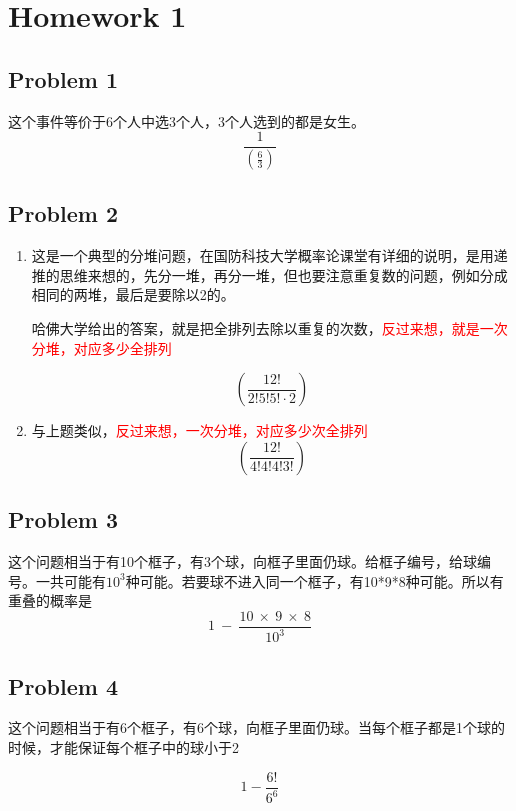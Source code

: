 \documentclass{article}
\begin{document}
\clearpage


\section*{Homework 1}
\subsection*{Problem 1}
这个事件等价于6个人中选3个人，3个人选到的都是女生。
$$
\frac{1}{\left( \frac{6}{3} \right)  } 
$$

\clearpage
\subsection*{Problem 2}
\begin{enumerate}[label=(\alph*)]
\item 这是一个典型的分堆问题，在国防科技大学概率论课堂有详细的说明，是用递推的思维来想的，先分一堆，再分一堆，但也要注意重复数的问题，例如分成相同的两堆，最后是要除以2的。

哈佛大学给出的答案，就是把全排列去除以重复的次数，\textcolor{red}{反过来想，就是一次分堆，对应多少全排列}

$$
\left( \frac{12!}{2!5!5!\cdot 2} \right)  
$$

\item 与上题类似，\textcolor{red}{反过来想，一次分堆，对应多少次全排列}
$$
\left( \frac{12!}{4!4!4!3!} \right)  
$$

\end{enumerate}

\clearpage


\subsection*{Problem 3}
这个问题相当于有10个框子，有3个球，向框子里面仍球。给框子编号，给球编号。一共可能有$10^{3}$种可能。若要球不进入同一个框子，有10*9*8种可能。所以有重叠的概率是 
$$
1\  -\  \frac{10\  \times \  9\  \times \  8}{{}10^{3}} 
$$

\clearpage

\subsection*{Problem 4}
这个问题相当于有6个框子，有6个球，向框子里面仍球。当每个框子都是1个球的时候，才能保证每个框子中的球小于2

$$
1-\frac{6!}{6^{6}} 
$$

\clearpage
\end{document}
